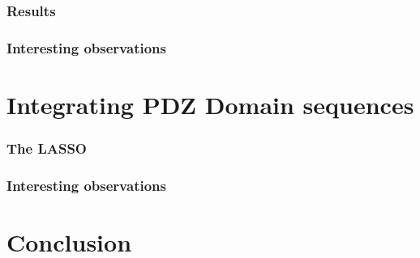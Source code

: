 \documentclass[a4paper, 12pt]{article}
\begin{document}
	\section{Results}
	\section{Interesting observations}
\part{Integrating PDZ Domain sequences} 
	\section{The LASSO}
	\section{Interesting observations}
\part{Conclusion}
\end{document}
